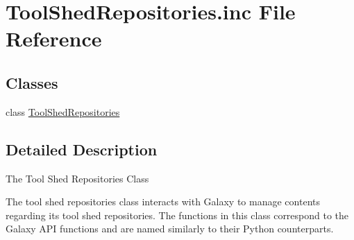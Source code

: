 \hypertarget{ToolShedRepositories_8inc}{}\section{Tool\+Shed\+Repositories.\+inc File Reference}
\label{ToolShedRepositories_8inc}
\subsection*{Classes}
\begin{DoxyCompactItemize}
\item 
class \hyperlink{classToolShedRepositories}{Tool\+Shed\+Repositories}
\end{DoxyCompactItemize}


\subsection{Detailed Description}
The Tool Shed Repositories Class

The tool shed repositories class interacts with Galaxy to manage contents regarding its tool shed repositories. The functions in this class correspond to the Galaxy A\+PI functions and are named similarly to their Python counterparts. 